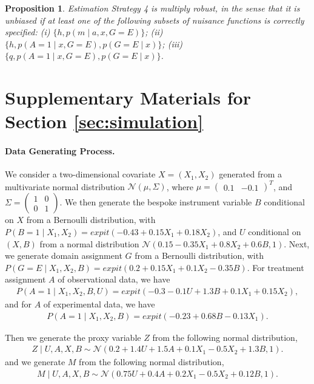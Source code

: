 \documentclass[10pt]{article}
\newtheorem{proposition}{Proposition}
\begin{document}
\begin{proposition}
\label{prop:DR:proximal_ate}	
Estimation Strategy 4 is multiply robust, in the sense that it is unbiased if at least one of the following subsets of nuisance functions is correctly specified:
(i) $\{h,p(m\mid a,x,G=E)\}$;
(ii) $\{h,p(A=1\mid x,G=E),p(G=E\mid x)\}$;
(iii) $\{q,p(A=1\mid x,G=E),p(G=E\mid x)\}$.
\end{proposition}


\section{Supplementary Materials for Section \ref{sec:simulation}}
\label{sec:simulation::supp}

\paragraph{Data Generating Process.}
We consider a two-dimensional covariate $X=(X_1,X_2)$ generated from a multivariate normal distribution $\mathcal{N}(\mu,\Sigma)$, where $\mu=\begin{pmatrix}
    0.1 & -0.1
\end{pmatrix}^T$, and $\Sigma=\begin{pmatrix}
    1 & 0\\
    0 & 1
\end{pmatrix}$. We then generate the bespoke instrument variable $B$ conditional on $X$ from a Bernoulli distribution, with $P(B=1\mid X_1,X_2)=expit(-0.43+0.15X_1+0.18X_2)$, and $U$ conditional on $(X,B)$ from a normal distribution $\mathcal{N}(0.15-0.35X_1+0.8X_2+0.6B,1)$. Next, we generate domain assignment $G$ from a Bernoulli distribution, with $P(G=E\mid X_1,X_2,B)=expit(0.2+0.15X_1+0.1X_2-0.35B)$. For treatment assignment $A$ of observational data, we have
\begin{align*}
    P(A=1\mid X_1,X_2,B,U)=expit(-0.3-0.1U+1.3B+0.1X_1+0.15X_2),
\end{align*}
and for $A$ of experimental data, we have
\begin{align*}
    P(A=1\mid X_1,X_2,B)=expit(-0.23+0.68B-0.13X_1).
\end{align*}

Then we generate the proxy variable $Z$ from the following normal distribution,
\begin{align*}
    Z\mid U,A,X,B \sim \mathcal{N}(0.2+1.4U+1.5A+0.1X_1-0.5X_2+1.3B,1).
\end{align*}
and we generate $M$ from the following normal distribution,
\begin{align*}
    M\mid U,A,X,B\sim \mathcal{N}(0.75U+0.4A+0.2X_1-0.5X_2+0.12B,1).
\end{align*}
\end{document}
